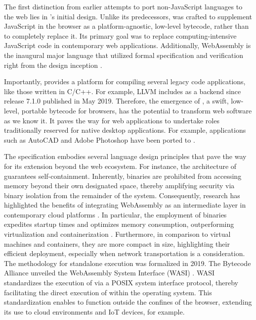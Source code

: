 The first distinction from earlier attempts to port non-JavaScript languages to the web lies in \Wasm's initial design. 
Unlike its predecessors, \Wasm was crafted to supplement JavaScript in the browser as a platform-agnostic, low-level bytecode, rather than to completely replace it. 
Its primary goal was to replace computing-intensive JavaScript code in contemporary web applications. 
Additionally, WebAssembly is the inaugural major language that utilized formal specification and verification right from the design inception \cite{Haas_2017, watt2018mechanising, 2023arXiv230513241T}. 


Importantly, \Wasm provides a platform for compiling several legacy code applications, like those written in C/C++. 
For example, LLVM includes \Wasm  as a backend since release 7.1.0 published in May 2019.
Therefore, the emergence of \Wasm, a swift, low-level, portable bytecode for browsers, has the potential to transform web software as we know it. 
It paves the way for web applications to undertake roles traditionally reserved for native desktop applications.
For example, applications such as AutoCAD and Adobe Photoshop have been ported to \Wasm{}. 


The \Wasm specification embodies several language design principles that pave the way for its extension beyond the web ecosystem.
For instance, the architecture of \Wasm guarantees self-containment.
Inherently, \Wasm binaries are prohibited from accessing memory beyond their own designated space, thereby amplifying security via binary isolation from the remainder of the system.
Consequently, research has highlighted the benefits of integrating WebAssembly as an intermediate layer in contemporary cloud platforms \cite{pMendkiServerless}.
In particular, the employment of \Wasm binaries expedites startup times and optimizes memory consumption, outperforming virtualization and containerization \cite{1244493Jacobsson}.
Furthermore, in comparison to virtual machines and containers, they are more compact in size, highlighting their efficient deployment, especially when network transportation is a consideration.
The methodology for standalone \Wasm execution was formalized in 2019.
The Bytecode Alliance unveiled the WebAssembly System Interface (WASI) \cite{bytecodealliance, WASI}.
WASI standardizes the execution of \Wasm via a POSIX system interface protocol, thereby facilitating the direct execution of \Wasm within the operating system.
This standardization enables \Wasm to function outside the confines of the browser, extending its use to cloud environments and IoT devices, for example.

